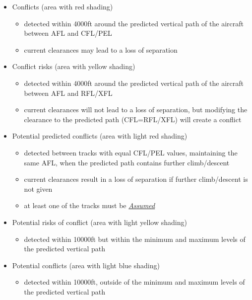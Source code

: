 \documentclass[a4paper,oneside,11pt]{memoir}
\newcommand{\stateref}[1]{\textit{\hyperref[state:#1]{#1}}}
\begin{document}
\begin{itemize}
    \item Conflicts (area with red shading)
    \begin{itemize}
        \item detected within 4000ft around the predicted vertical path of the aircraft between AFL and CFL/PEL
        \item current clearances may lead to a loss of separation
    \end{itemize}
    \item Conflict risks (area with yellow shading)
    \begin{itemize}
        \item detected within 4000ft around the predicted vertical path of the aircraft between AFL and RFL/XFL
        \item current clearances will not lead to a loss of separation, but modifying the clearance to the predicted path (CFL=RFL/XFL) will create a conflict
    \end{itemize}
    \item Potential predicted conflicts (area with light red shading)
    \begin{itemize}
        \item detected between tracks with equal CFL/PEL values, maintaining the same AFL, when the predicted path contains further climb/descent
        \item current clearances result in a loss of separation if further climb/descent is not given
        \item at least one of the tracks must be \stateref{Assumed}
    \end{itemize}
    \item Potential risks of conflict (area with light yellow shading)
    \begin{itemize}
        \item detected within 10000ft but within the minimum and maximum levels of the predicted vertical path
    \end{itemize}
    \item Potential conflicts (area with light blue shading)
    \begin{itemize}
        \item detected within 10000ft, outside of the minimum and maximum levels of the predicted vertical path
    \end{itemize}
\end{itemize}

\bigskip
\end{document}
